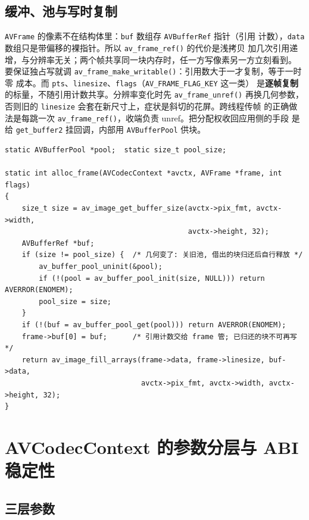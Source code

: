 \documentclass[12pt,a4paper,fontset=fandol]{ctexbook}
\newcommand{\Fn}[1]{\texttt{#1()}}
\newcommand{\Tp}[1]{\texttt{#1}}
\begin{document}
\subsection{缓冲、池与写时复制}

\Tp{AVFrame} 的像素不在结构体里：\Tp{buf} 数组存 \Tp{AVBufferRef} 指针（引用
计数），\Tp{data} 数组只是带偏移的裸指针。所以 \Fn{av\_frame\_ref} 的代价是浅拷贝
加几次引用递增，与分辨率无关；两个帧共享同一块内存时，任一方写像素另一方立刻看到。
要保证独占写就调 \Fn{av\_frame\_make\_writable}：引用数大于一才复制，等于一时零
成本。而 \Tp{pts}、\Tp{linesize}、\Tp{flags}（\Tp{AV\_FRAME\_FLAG\_KEY} 这一类）
是\textbf{逐帧复制}的标量，不随引用计数共享。分辨率变化时先 \Fn{av\_frame\_unref}
再换几何参数，否则旧的 \Tp{linesize} 会套在新尺寸上，症状是斜切的花屏。跨线程传帧
的正确做法是每跳一次 \Fn{av\_frame\_ref}，收端负责 unref。把分配权收回应用侧的手段
是给 \Tp{get\_buffer2} 挂回调，内部用 \Tp{AVBufferPool} 供块。

\begin{lstlisting}[style=cstyle,caption={用缓冲池让解码器输出帧复用同一组像素缓冲，避开每帧分配},label={lst:ch06-pool}]
static AVBufferPool *pool;  static size_t pool_size;

static int alloc_frame(AVCodecContext *avctx, AVFrame *frame, int flags)
{
    size_t size = av_image_get_buffer_size(avctx->pix_fmt, avctx->width,
                                           avctx->height, 32);
    AVBufferRef *buf;
    if (size != pool_size) {  /* 几何变了: 关旧池, 借出的块归还后自行释放 */
        av_buffer_pool_uninit(&pool);
        if (!(pool = av_buffer_pool_init(size, NULL))) return AVERROR(ENOMEM);
        pool_size = size;
    }
    if (!(buf = av_buffer_pool_get(pool))) return AVERROR(ENOMEM);
    frame->buf[0] = buf;      /* 引用计数交给 frame 管; 已归还的块不可再写 */
    return av_image_fill_arrays(frame->data, frame->linesize, buf->data,
                                avctx->pix_fmt, avctx->width, avctx->height, 32);
}
\end{lstlisting}

\section{AVCodecContext 的参数分层与 ABI 稳定性}

\subsection{三层参数}
\end{document}
